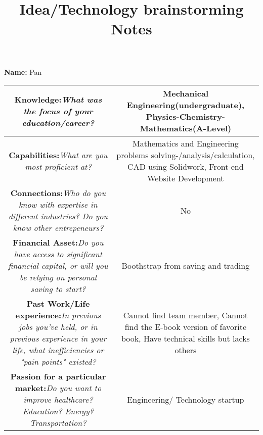 \documentclass[a3paper, landscape]{article}
\title{Idea/Technology brainstorming Notes}
\begin{document}
\maketitle

\Large{\textbf{Name:} Pan}
\begin{table}[h]
\begin{tabular}{|c|c|}
\hline
\textbf{Knowledge:}\textit{What was the focus of your education/career?}&\color{blue}Mechanical Engineering(undergraduate), Physics-Chemistry-Mathematics(A-Level)\\
\hline
\textbf{Capabilities:}\textit{What are you most proficient at?}&\color{blue}Mathematics and Engineering problems solving-/analysis/calculation, CAD using Solidwork, Front-end Website Development\\
\hline
\textbf{Connections:}\textit{Who do you know with expertise in different industries? Do you know other entrepeneurs?}&\color{blue}No\\
\hline
\textbf{Financial Asset:}\textit{Do you have access to significant financial capital, or will you be relying on personal saving to start?}&\color{blue} Boothstrap from saving and trading\\
\hline
\textbf{Past Work/Life experience:}\textit{In previous jobs you've held, or in previous experience in your life, what inefficiencies or "pain points" existed?}&\color{blue}Cannot find team member, Cannot find the E-book version of favorite book, Have technical skills but lacks others\\
\hline
\textbf{Passion for a particular market:}\textit{Do you want to improve healthcare? Education? Energy? Transportation?}&\color{blue}Engineering/ Technology startup\\
\hline
\end{tabular}
\end{table}
\end{document}
